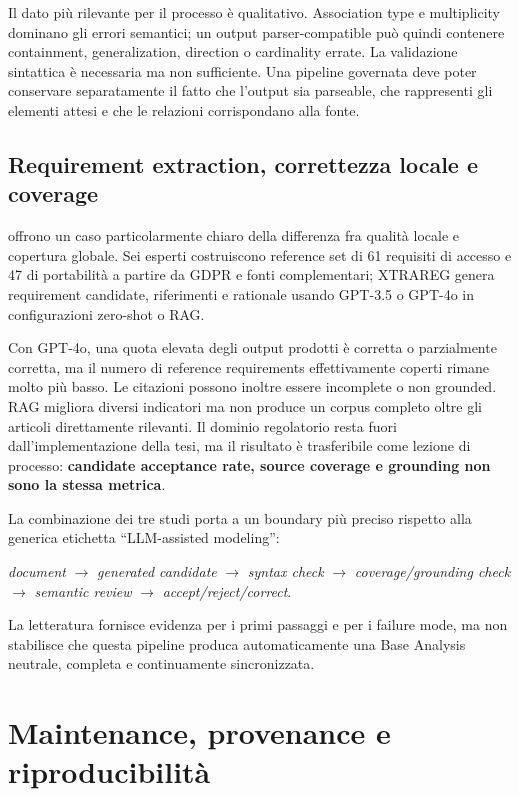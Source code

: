 \documentclass[12pt,a4paper,oneside]{report}
\begin{document}
Il dato più rilevante per il processo è qualitativo. Association type e multiplicity dominano gli errori semantici; un output parser-compatible può quindi contenere containment, generalization, direction o cardinality errate. La validazione sintattica è necessaria ma non sufficiente. Una pipeline governata deve poter conservare separatamente il fatto che l'output sia parseable, che rappresenti gli elementi attesi e che le relazioni corrispondano alla fonte.

\subsection{Requirement extraction, correttezza locale e coverage}

\citet{abualhaija2025regulatory} offrono un caso particolarmente chiaro della differenza fra qualità locale e copertura globale. Sei esperti costruiscono reference set di 61 requisiti di accesso e 47 di portabilità a partire da GDPR e fonti complementari; XTRAREG genera requirement candidate, riferimenti e rationale usando GPT-3.5 o GPT-4o in configurazioni zero-shot o RAG.

Con GPT-4o, una quota elevata degli output prodotti è corretta o parzialmente corretta, ma il numero di reference requirements effettivamente coperti rimane molto più basso. Le citazioni possono inoltre essere incomplete o non grounded. RAG migliora diversi indicatori ma non produce un corpus completo oltre gli articoli direttamente rilevanti. Il dominio regolatorio resta fuori dall'implementazione della tesi, ma il risultato è trasferibile come lezione di processo: \textbf{candidate acceptance rate, source coverage e grounding non sono la stessa metrica}.

La combinazione dei tre studi porta a un boundary più preciso rispetto alla generica etichetta ``LLM-assisted modeling'':

\begin{center}
\textit{document} $\rightarrow$ \textit{generated candidate} $\rightarrow$ \textit{syntax check} $\rightarrow$ \textit{coverage/grounding check} $\rightarrow$ \textit{semantic review} $\rightarrow$ \textit{accept/reject/correct}.
\end{center}

La letteratura fornisce evidenza per i primi passaggi e per i failure mode, ma non stabilisce che questa pipeline produca automaticamente una Base Analysis neutrale, completa e continuamente sincronizzata.

\section{Maintenance, provenance e riproducibilità}
\end{document}
